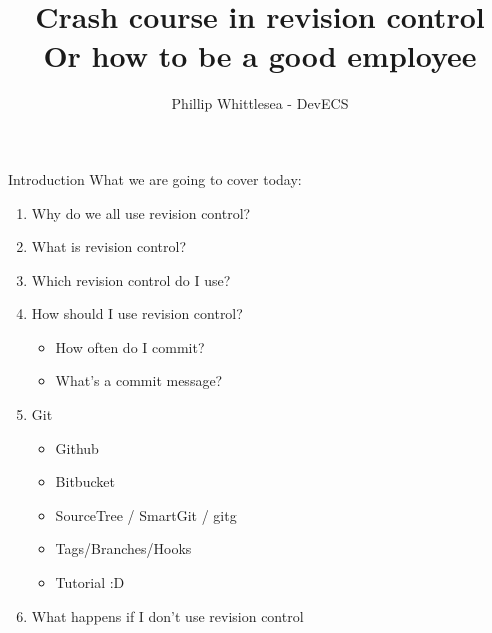 \documentclass{beamer}
\title[Using Git like a baus]{Crash course in revision control\\Or how to be a good employee}
\author{Phillip Whittlesea - DevECS}
\institute{Electronics and Computer Science}
\begin{document}
\begin{frame}
    \titlepage
\end{frame}

\begin{frame}{Introduction}
    What we are going to cover today:
    \begin{enumerate}
        \item Why do we all use revision control?
        \item What is revision control?
        \item Which revision control do I use?
        \item How should I use revision control?
        \begin{itemize}
        	\item How often do I commit?
        	\item What's a commit message?
        \end{itemize}
        \item Git
        \begin{itemize}
     	    \item Github
    	    \item Bitbucket
        	\item SourceTree / SmartGit / gitg
        	\item Tags/Branches/Hooks
        	\item Tutorial :D
        \end{itemize}
        \item What happens if I don't use revision control
    \end{enumerate}
\end{frame}

%
\end{document}
